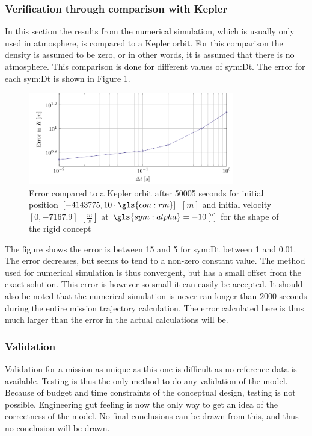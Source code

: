 \subsubsection{Verification through comparison with Kepler}
\label{sec:astroverf}

In this section the results from the numerical simulation, which is usually only used in atmosphere, is compared to a Kepler orbit. For this comparison the density is assumed to be zero, or in other words, it is assumed that there is no atmosphere. This comparison is done for different values of \gls{sym:Dt}. The error for each \gls{sym:Dt} is shown in Figure \ref{fig:kep_error}.

\begin{figure}[ht]
	\centering
	\includegraphics[width=0.8\textwidth]{Figure/orbit/num_kep.pdf}
	\caption{Error compared to a Kepler orbit after 50005 seconds for initial position $\left[-4143775,10\cdot\gls{con:rm}\right]$ $\left[m\right]$ and initial velocity $\left[0,-7167.9\right]$ $\left[\frac{m}{s}\right]$ at $\gls{sym:alpha}=-10\left[^\circ\right]$ for the shape of the rigid concept}
	\label{fig:kep_error}
\end{figure}

The figure shows the error is between 15 and 5 for \gls{sym:Dt} between 1 and 0.01. The error decreases, but seems to tend to a non-zero constant value. The method used for numerical simulation is thus convergent, but has a small offset from the exact solution. This error is however so small it can easily be accepted. It should also be noted that the numerical simulation is never ran longer than 2000 seconds during the entire mission trajectory calculation. The error calculated here is thus much larger than the error in the actual calculations will be.

\subsubsection{Validation}
\label{sec:astroval}

Validation for a mission as unique as this one is difficult as no reference data is available. Testing is thus the only method to do any validation of the model. Because of budget and time constraints of the conceptual design, testing is not possible. Engineering gut feeling is now the only way to get an idea of the correctness of the model. No final conclusions can be drawn from this, and thus no conclusion will be drawn.